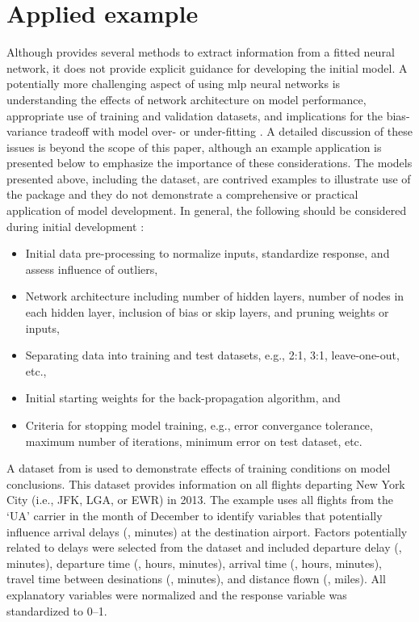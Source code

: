 \documentclass[article,shortnames]{jss}\usepackage[]{graphicx}\usepackage[]{color}
\begin{document}
\section[Applied example]{Applied example}

Although  provides several methods to extract information from a fitted neural network, it does not provide explicit guidance for developing the initial model.  A potentially more challenging aspect of using \ac{mlp} neural networks is understanding the effects of network architecture on model performance, appropriate use of training and validation datasets, and implications for the bias-variance tradeoff with model over- or under-fitting \citep{Maier00}.  A detailed discussion of these issues is beyond the scope of this paper, although an example application is presented below to emphasize the importance of these considerations.  The models presented above, including the  dataset, are contrived examples to illustrate use of the  package and they do not demonstrate a comprehensive or practical application of model development.  In general, the following should be considered during initial development \cite{Ripley96, Lek00, Maier00}:
\begin{itemize}
\item Initial data pre-processing to normalize inputs, standardize response, and assess influence of outliers,
\item Network architecture including number of hidden layers, number of nodes in each hidden layer, inclusion of bias or skip layers, and pruning weights or inputs,
\item Separating data into training and test datasets, e.g., 2:1, 3:1, leave-one-out, etc., 
\item Initial starting weights for the back-propagation algorithm, and
\item Criteria for stopping model training, e.g., error convergance tolerance, maximum number of iterations, minimum error on test dataset, etc.
\end{itemize}

A dataset from  \citep{Wickham14b} is used to demonstrate effects of training conditions on model conclusions.  This dataset provides information on all flights departing New York City (i.e., JFK, LGA, or EWR) in 2013.  The example uses all flights from the `UA' carrier in the month of December to identify variables that potentially influence arrival delays (, minutes) at the destination airport.  Factors potentially related to delays were selected from the dataset and included departure delay (, minutes), departure time (, hours, minutes), arrival time (, hours, minutes), travel time between desinations (, minutes), and distance flown (, miles).  All explanatory variables were normalized and the response variable was standardized to 0--1.
\end{document}
